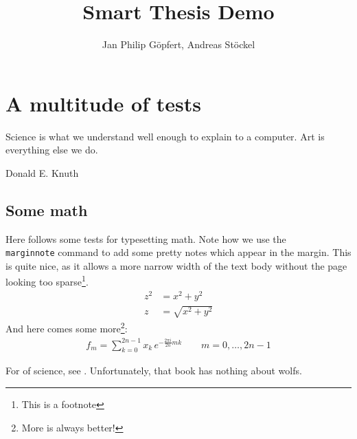 \documentclass[a4paper,11pt]{memoir}
\title{Smart Thesis Demo}
\author{Jan Philip Göpfert, Andreas Stöckel}
\begin{document}
\frontmatter

\begin{titlingpage}
  \maketitle
\end{titlingpage}

\tableofcontents

\mainmatter

\chapter{A multitude of tests}

\epigraph{Science is what we understand well enough to explain to a computer. Art is everything else we do.}{Donald E. Knuth}

\blindtext

\section{Some math}

Here follows some tests for typesetting math. Note how we use the \texttt{\\marginnote} command to add some pretty notes which appear in the margin. This is quite nice, as it allows a more narrow width of the text body without the page looking too sparse\footnote{This is a footnote}.
\begin{align}
  z^2 &= x^2 + y^2 \\
  z &= \sqrt{x^2 + y^2}
\end{align}
And here comes some more\footnote{More is always better!}:
\begin{align}
	f_m =  \sum_{k=0}^{2n-1} x_k \, e^{-\frac{2\pi i}{2n} mk } \label{eqn:dft}
\qquad
m = 0,\dotsc,2n-1
\end{align}

For of science, see \cite{botsch2010polygon}. Unfortunately, that book has nothing about \glspl{wolf}.
\end{document}
